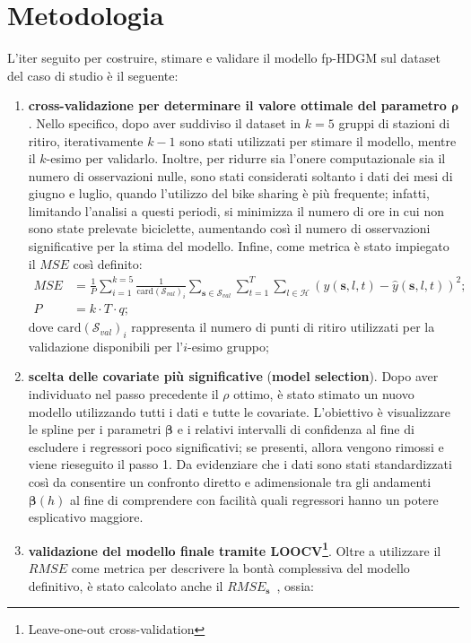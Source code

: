 \section{Metodologia}
L'iter seguito per costruire, stimare e validare il modello fp-HDGM sul dataset del caso di studio è il seguente:
\begin{enumerate}
	\item \textbf{cross-validazione per determinare il valore ottimale del parametro $\boldsymbol{\rho}$}. Nello specifico, dopo aver suddiviso il dataset in $k=5$ gruppi di stazioni di ritiro, iterativamente $k-1$ sono stati utilizzati per stimare il modello, mentre il $k$-esimo per validarlo. Inoltre, per ridurre sia l'onere computazionale sia il numero di osservazioni nulle, sono stati considerati soltanto i dati dei mesi di giugno e luglio, quando l'utilizzo del bike sharing è più frequente; infatti, limitando l'analisi a questi periodi, si minimizza il numero di ore in cui non sono state prelevate biciclette, aumentando così il numero di osservazioni significative per la stima del modello. Infine, come metrica è stato impiegato il $MSE$ così definito:
	\begin{equation}
		\begin{aligned}
			MSE &= \frac{1}{P}\sum_{i=1}^{k=5}\frac{1}{\text{card}(\mathcal{S}_{val})_i}\sum_{\mathbf{s}\in\mathcal{S}_{val}}^{}\sum_{t=1}^{T}\sum_{l\in\mathcal{H}}^{} (y(\mathbf{s}, l, t) - \hat{y}(\mathbf{s}, l, t))^2; \\
			P &= k\cdot T\cdot q;
		\end{aligned}
	\end{equation}
	dove $\text{card}(\mathcal{S}_{val})_i$ rappresenta il numero di punti di ritiro utilizzati per la validazione disponibili per l'$i$-esimo gruppo;
	\item \textbf{scelta delle covariate più significative} (\textbf{model selection}). Dopo aver individuato nel passo precedente il $\rho$ ottimo, è stato stimato un nuovo modello utilizzando tutti i dati e tutte le covariate. L'obiettivo è visualizzare le spline per i parametri $\boldsymbol{\beta}$ e i relativi intervalli di confidenza al fine di escludere i regressori poco significativi; se presenti, allora vengono rimossi e viene rieseguito il passo \num{1}. Da evidenziare che i dati sono stati standardizzati così da consentire un confronto diretto e adimensionale tra gli andamenti $\boldsymbol{\beta}(h)$ al fine di comprendere con facilità quali regressori hanno un potere esplicativo maggiore.
	\item \textbf{validazione del modello finale tramite LOOCV\footnote{Leave-one-out cross-validation}}. Oltre a utilizzare il $RMSE$ come metrica per descrivere la bontà complessiva del modello definitivo, è stato calcolato anche il $RMSE_\mathbf{s}$~\citep{paper_f_HDGM}, ossia:

\end{enumerate}
